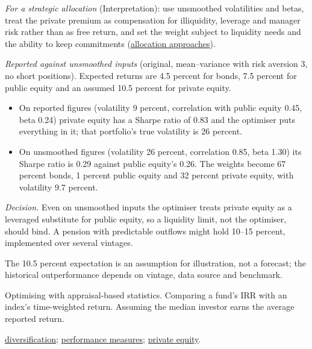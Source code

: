 \begin{qfmethod}
\emph{For a strategic allocation} (Interpretation): use unsmoothed volatilities and betas, treat the private premium as compensation for illiquidity, leverage and manager risk rather than as free return, and set the weight subject to liquidity needs and the ability to keep commitments (\hyperref[meth:alternatives-allocation-approaches]{allocation approaches}).

 \emph{Reported against unsmoothed inputs} (original, mean--variance with risk aversion 3, no short positions). Expected returns are 4.5 percent for bonds, 7.5 percent for public equity and an assumed 10.5 percent for private equity.
\begin{itemize}
\item On reported figures (volatility 9 percent, correlation with public equity 0.45, beta 0.24) private equity has a Sharpe ratio of 0.83 and the optimiser puts everything in it; that portfolio's true volatility is 26 percent.
\item On unsmoothed figures (volatility 26 percent, correlation 0.85, beta 1.30) its Sharpe ratio is 0.29 against public equity's 0.26. The weights become 67 percent bonds, 1 percent public equity and 32 percent private equity, with volatility 9.7 percent.
\end{itemize}
\emph{Decision.} Even on unsmoothed inputs the optimiser treats private equity as a leveraged substitute for public equity, so a liquidity limit, not the optimiser, should bind. A pension with predictable outflows might hold 10--15 percent, implemented over several vintages.

 The 10.5 percent expectation is an assumption for illustration, not a forecast; the historical outperformance depends on vintage, data source and benchmark.

 Optimising with appraisal-based statistics. Comparing a fund's IRR with an index's time-weighted return. Assuming the median investor earns the average reported return.

 \hyperref[meth:private-capital-diversification]{diversification}; \hyperref[meth:private-fund-multiples-pme]{performance measures}; \hyperref[def:private-equity-features]{private equity}.

\end{qfmethod}

